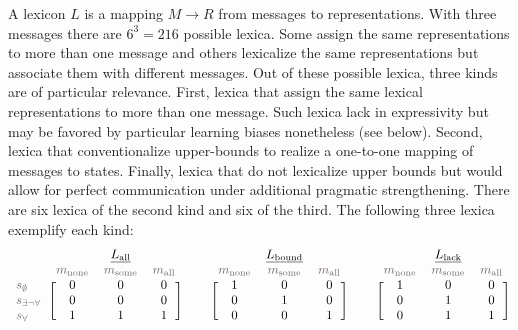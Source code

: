 \documentclass[a4paper, 11pt]{article}
\theoremstyle{Satz}
\newcommand{\state}{\ensuremath{s}\xspace}		%
\newcommand{\mystate}[1]{\ensuremath{\state_{\text{#1}}}\xspace} %
\newcommand{\mylang}[1]{\ensuremath{L_{\text{#1}}}\xspace} %
\newcommand{\Messgs}{\ensuremath{M}\xspace}		%
\newcommand{\messg}{\ensuremath{m}\xspace}		%
\newcommand{\mymessg}[1]{\ensuremath{\messg_{\text{#1}}}\xspace} %
\newcommand{\ssome}{\mystate{\ensuremath{\exists\neg\forall}}}
\newcommand{\sall}{\mystate{\ensuremath{\forall}}}
\newcommand{\snone}{\mystate{\ensuremath{\emptyset}}}
\newcommand{\msome}{\mymessg{some}}
\newcommand{\mall}{\mymessg{all}}
\newcommand{\mnone}{\mymessg{none}}
\newcommand{\Lall}{\mylang{all}}
\newcommand{\Lbound}{\mylang{bound}}
\newcommand{\Llack}{\mylang{lack}}
\newcommand{\mygray}[1]{{\textcolor{mygray}{#1}}}
\begin{document}
A lexicon $L$ is a mapping $\Messgs \rightarrow R$ from messages to representations. With three
messages there are $6^3 = 216$ possible lexica. Some assign the same representations to more
than one message and others lexicalize the same representations but associate them with
different messages. Out of these possible lexica, three kinds are of particular
relevance. First, lexica that assign the same lexical representations to more than one
message. Such lexica lack in expressivity but may be favored by particular learning biases
nonetheless (see below). Second, lexica that conventionalize upper-bounds to realize a
one-to-one mapping of messages to states. Finally, lexica that do not lexicalize upper bounds
but would allow for perfect communication under additional pragmatic strengthening. There are
six lexica of the second kind and six of the third.  The following three lexica exemplify each
kind:
\begin{align*}
  \begin{blockarray}{lccc}
    & & \underline{\Lall} & \\
    & \mygray{\mnone} & \mygray{\msome} & \mygray{\mall} \\
    \begin{block}{l[ccc]}
     \mygray{\snone}  & 0 & 0 & 0\\
     \mygray{\ssome}  & 0 & 0 & 0\\
    \mygray{\sall}   & 1 & 1 & 1\\
    \end{block}
  \end{blockarray} & &
 \begin{blockarray}{lccc}
    & & \underline{\Lbound} & \\
    & \mygray{\mnone} & \mygray{\msome} & \mygray{\mall} \\
    \begin{block}{l[ccc]}
       & 1 & 0 & 0\\
       & 0 & 1 & 0\\
       & 0 & 0 & 1\\
    \end{block}
  \end{blockarray} & &
  \begin{blockarray}{lccc}
    & & \underline{\Llack} & \\
    & \mygray{\mnone} & \mygray{\msome} & \mygray{\mall} \\
    \begin{block}{l[ccc]}
       & 1 & 0 & 0\\
       & 0 & 1 & 0\\
       & 0 & 1 & 1\\
    \end{block}
  \end{blockarray}
\end{align*}
\end{document}
